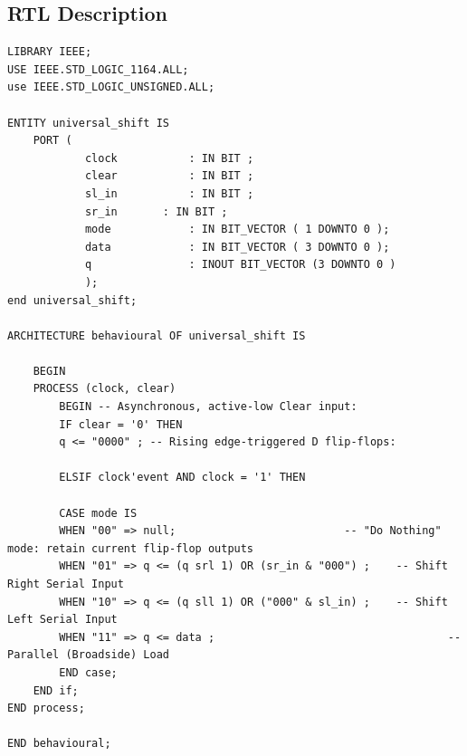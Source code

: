 \documentclass[12pt]{article}
\begin{document}
\subsection{RTL Description}
\begin{lstlisting}[style=VHDL, frame=single,linewidth = 17cm]
LIBRARY IEEE;
USE IEEE.STD_LOGIC_1164.ALL;
use IEEE.STD_LOGIC_UNSIGNED.ALL;

ENTITY universal_shift IS
	PORT (
			clock			: IN BIT ;
			clear			: IN BIT ; 
			sl_in			: IN BIT ; 
			sr_in 		: IN BIT ;
			mode 			: IN BIT_VECTOR ( 1 DOWNTO 0 );
			data 			: IN BIT_VECTOR ( 3 DOWNTO 0 );
			q 				: INOUT BIT_VECTOR (3 DOWNTO 0 )
			);
end universal_shift;

ARCHITECTURE behavioural OF universal_shift IS

	BEGIN
	PROCESS (clock, clear)
		BEGIN -- Asynchronous, active-low Clear input:
		IF clear = '0' THEN
		q <= "0000" ; -- Rising edge-triggered D flip-flops:
		
		ELSIF clock'event AND clock = '1' THEN
		
		CASE mode IS
		WHEN "00" => null; 							-- "Do Nothing" mode: retain current flip-flop outputs
		WHEN "01" => q <= (q srl 1) OR (sr_in & "000") ; 	-- Shift Right Serial Input
		WHEN "10" => q <= (q sll 1) OR ("000" & sl_in) ; 	-- Shift Left Serial Input
		WHEN "11" => q <= data ; 									-- Parallel (Broadside) Load
		END case;
	END if;
END process;

END behavioural;
\end{lstlisting}
\newpage
\end{document}
